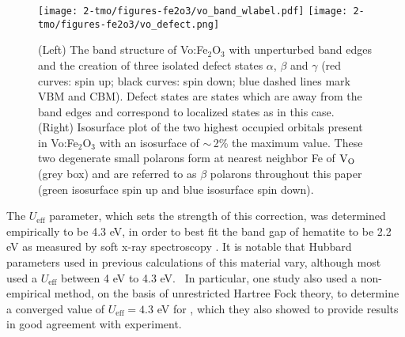 \begin{figure}
\begin{center}
\texttt{[image: 2-tmo/figures-fe2o3/vo\_band\_wlabel.pdf]} %
\vspace{2mm}
\texttt{[image: 2-tmo/figures-fe2o3/vo\_defect.png]}
\caption{(Left) The band structure of Vo:Fe$_2$O$_3$ with unperturbed band edges and the creation of three isolated defect states $\alpha$, $\beta$ and $\gamma$ (red curves: spin up; black curves: spin down; blue dashed lines mark VBM and CBM). Defect states are states which are away from the band edges and correspond to localized states as in this case. (Right) Isosurface plot of the two highest occupied orbitals present in Vo:Fe$_2$O$_3$ with an isosurface of $\sim\,$2\% the maximum value. These two degenerate small polarons form at nearest neighbor Fe of $\text{V}_\text{O}$ (grey box) and are referred to as $\beta$ polarons throughout this paper (green isosurface spin up and blue isosurface spin down).} \label{fe2o3:fig:vo}
\end{center}
\end{figure}



The $U_{\text{eff}}$ parameter, which sets the strength of this correction, was determined empirically to be 4.3 eV, in order to best fit the band gap of hematite to be 2.2 eV as measured by soft x-ray spectroscopy \cite{gilbert2009band}. It is notable that Hubbard parameters used in previous calculations of this material vary, although most used a $U_{\text{eff}}$ between 4 eV to 4.3 eV.~\cite{lee2013thermodynamics,adelstein2014density,cava2013effects,zhou2015understanding,mosey2008rotationally,rollmann2004first,liao2011electron} In particular, one study also used a non-empirical method, on the basis of unrestricted Hartree Fock theory, to determine a converged value of $U_{\text{eff}} = 4.3$ eV for , which they also showed to provide results in good agreement with experiment.~\cite{mosey2008rotationally}


